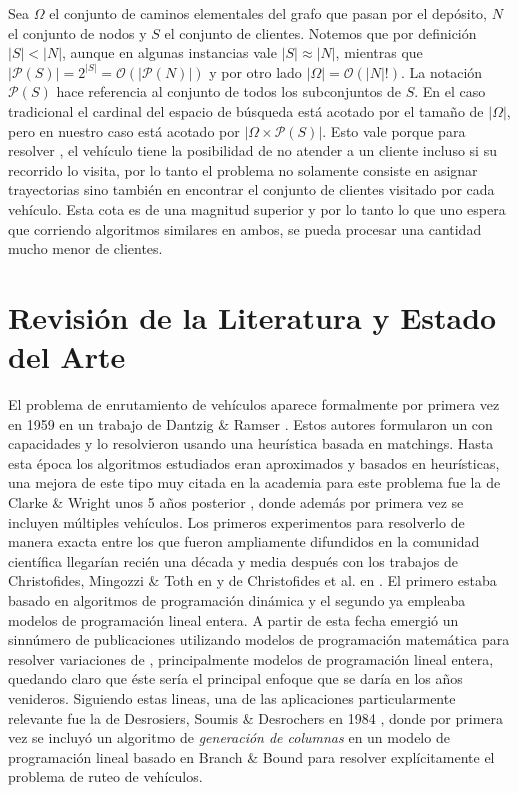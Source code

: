 Sea $\Omega$ el conjunto de caminos elementales del grafo que pasan por el depósito, $N$ el conjunto de nodos y $S$ el conjunto de clientes. Notemos que por definición $|S| < |N|$, aunque en algunas instancias vale $|S| \approx |N|$, mientras que $|\mathscr{P}(S)| = 2^{|S|} = \mathcal{O}(|\mathscr{P}(N)|)$ y por otro lado $|\Omega| = \mathcal{O}(|N|!)$. La notación $\mathscr{P}(S)$ hace referencia al conjunto de todos los subconjuntos de $S$. En el caso tradicional el cardinal del espacio de búsqueda está acotado por el tamaño de $|\Omega|$, pero en nuestro caso está acotado por $|\Omega \times \mathscr{P}(S)|$. Esto vale porque para resolver , el vehículo tiene la posibilidad de no atender a un cliente incluso si su recorrido lo visita, por lo tanto el problema no solamente consiste en asignar trayectorias sino también en encontrar el conjunto de clientes visitado por cada vehículo. Esta cota es de una magnitud superior y por lo tanto lo que uno espera que corriendo algoritmos similares en ambos, se pueda procesar una cantidad mucho menor de clientes.  


\section{Revisión de la Literatura y Estado del Arte}

El problema de enrutamiento de vehículos aparece formalmente por primera vez en 1959 en un trabajo de Dantzig \& Ramser \cite{dantzig-ramser}. Estos autores formularon un  con capacidades y lo resolvieron usando una heurística basada en matchings. Hasta esta época los algoritmos estudiados eran aproximados y basados en heurísticas, una mejora de este tipo muy citada en la academia para este problema fue la de Clarke \& Wright unos 5 años posterior \cite{clarke-wright}, donde además por primera vez se incluyen múltiples vehículos. Los primeros experimentos para resolverlo de manera exacta entre los que fueron ampliamente difundidos en la comunidad científica llegarían recién una década y media después con los trabajos de Christofides, Mingozzi \& Toth en \cite{christo-mingozzi-toth} y de Christofides et al. en \cite{christo-et-al}. El primero estaba basado en algoritmos de programación dinámica y el segundo ya empleaba modelos de programación lineal entera. A partir de esta fecha emergió un sinnúmero de publicaciones utilizando modelos de programación matemática para resolver variaciones de , principalmente modelos de programación lineal entera, quedando claro que éste sería el principal enfoque que se daría en los años venideros. Siguiendo estas lineas, una de las aplicaciones particularmente relevante fue la de Desrosiers, Soumis \& Desrochers en 1984 \cite{desrosiers-soumis-desrochers}, donde por primera vez se incluyó un algoritmo de \emph{generación de columnas} en un modelo de programación lineal basado en Branch \& Bound para resolver explícitamente el problema de ruteo de vehículos.
  
